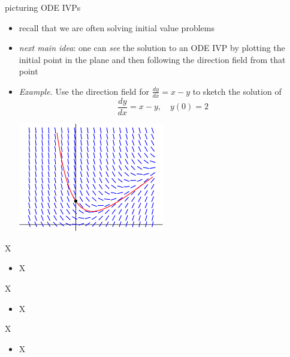 \documentclass{beamer}
\begin{document}
\begin{frame}{picturing ODE IVPs}

\begin{itemize}
\item recall that we are often solving initial value problems
\item \emph{next main idea}:  one can \emph{see} the solution to an ODE IVP by plotting the initial point in the plane and then following the direction field from that point

\bigskip
\item \begin{minipage}[t]{0.37\textwidth}
\emph{Example.}  Use the direction field for
$\frac{dy}{dx} = x-y$ to sketch the solution of
    $$\frac{dy}{dx} = x-y, \quad y(0)=2$$
\end{minipage}

\vspace{-25mm}
\hfill \includegraphics[width=0.5\textwidth]{figs/example-field-solution}
\end{itemize}
\end{frame}


\begin{frame}{X}

\begin{itemize}
\item X
\end{itemize}
\end{frame}


\begin{frame}{X}

\begin{itemize}
\item X
\end{itemize}
\end{frame}


\begin{frame}{X}

\begin{itemize}
\item X
\end{itemize}
\end{frame}
\end{document}
